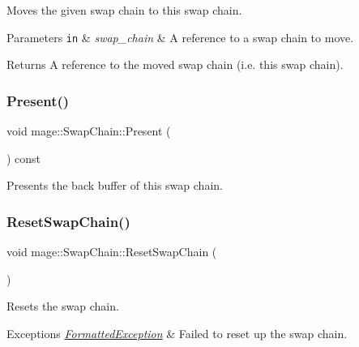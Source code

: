 Moves the given swap chain to this swap chain.


\begin{DoxyParams}[1]{Parameters}
\mbox{\tt in}  & {\em swap\+\_\+chain} & A reference to a swap chain to move. \\
\hline
\end{DoxyParams}
\begin{DoxyReturn}{Returns}
A reference to the moved swap chain (i.\+e. this swap chain). 
\end{DoxyReturn}
\hypertarget{classmage_1_1_swap_chain_a477d34baf72331aeff23f32cd34518b6}{}\label{classmage_1_1_swap_chain_a477d34baf72331aeff23f32cd34518b6} 
\subsubsection{\texorpdfstring{Present()}{Present()}}
{\footnotesize\ttfamily void mage\+::\+Swap\+Chain\+::\+Present (\begin{DoxyParamCaption}{ }\end{DoxyParamCaption}) const\hspace{0.3cm}{\ttfamily [noexcept]}}

Presents the back buffer of this swap chain. \hypertarget{classmage_1_1_swap_chain_a30b25245e86823e1b08a39887de8d918}{}\label{classmage_1_1_swap_chain_a30b25245e86823e1b08a39887de8d918} 
\subsubsection{\texorpdfstring{Reset\+Swap\+Chain()}{ResetSwapChain()}}
{\footnotesize\ttfamily void mage\+::\+Swap\+Chain\+::\+Reset\+Swap\+Chain (\begin{DoxyParamCaption}{ }\end{DoxyParamCaption})\hspace{0.3cm}{\ttfamily [private]}}

Resets the swap chain.


\begin{DoxyExceptions}{Exceptions}
{\em \hyperlink{structmage_1_1_formatted_exception}{Formatted\+Exception}} & Failed to reset up the swap chain. \\
\hline
\end{DoxyExceptions}
\hypertarget{classmage_1_1_swap_chain_a662009705a6e23064351fd0d9b77ef0e}{}\label{classmage_1_1_swap_chain_a662009705a6e23064351fd0d9b77ef0e} 
